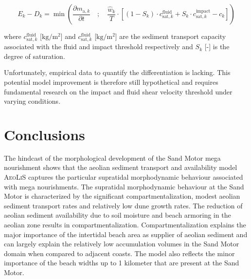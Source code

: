 \begin{equation}
  \label{eq:erodep_split}
  E_k - D_k = \min \left( 
  \frac{\partial m_{\mathrm{a},k}}{\partial t} \quad ; \quad 
  \frac{\hat{w}_k}{T} \cdot \left[
    (1 - S_k) \cdot c^{\mathrm{fluid}}_{\mathrm{sat},k} +
    S_k \cdot c^{\mathrm{impact}}_{\mathrm{sat},k} - c_k
    \right]
  \right)
\end{equation}

\noindent where $c^{\mathrm{fluid}}_{\mathrm{sat},k}$
[$\mathrm{kg/m^2}$] and $c^{\mathrm{fluid}}_{\mathrm{sat},k}$
[$\mathrm{kg/m^2}$] are the sediment transport capacity associated
with the fluid and impact threshold respectively and $S_k$ [-] is the
degree of saturation.

Unfortunately, empirical data to quantify the differentiation is
lacking. This potential model improvement is therefore still
hypothetical and requires fundamental research on the impact and fluid
shear velocity threshold under varying conditions.









\section{Conclusions}

The hindcast of the morphological development of the Sand Motor mega
nourishment shows that the aeolian sediment transport and availability
model \textsc{AeoLiS} captures the particular supratidal morphodynamic
behaviour associated with mega nourishments. The supratidal
morphodynamic behaviour at the Sand Motor is characterized by the
significant compartmentalization, modest aeolian sediment transport
rates and relatively low dune growth rates. The reduction of aeolian
sediment availability due to soil moisture and beach armoring in the
aeolian zone results in compartmentalization.  Compartmentalization
explains the major importance of the intertidal beach area as supplier
of aeolian sediment and can largely explain the relatively low
accumulation volumes in the Sand Motor domain when compared to
adjacent coasts. The model also reflects the minor importance of the
beach widths up to 1 kilometer that are present at the Sand Motor.

